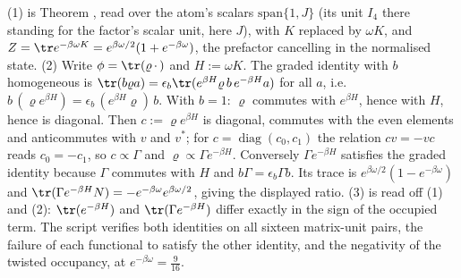 (1) is Theorem , read over the atom's scalars $\mathrm{span}\{1, J\}$ (its unit $I_4$ there standing for the factor's scalar unit, here $J$), with $K$ replaced by $\omega K$, and $Z = \tr e^{-\beta\omega K} = e^{\beta\omega/2}(1 + e^{-\beta\omega})$, the prefactor cancelling in the normalised state. (2) Write $\phi = \tr(\varrho\,\cdot\,)$ and $H := \omega K$. The graded identity with $b$ homogeneous is $\tr(b\varrho a) = \epsilon_b\tr(e^{\beta H}\varrho\,b\,e^{-\beta H}a)$ for all $a$, i.e.\ $b\,(\varrho e^{\beta H}) = \epsilon_b\,(e^{\beta H}\varrho)\,b$. With $b = 1$: $\varrho$ commutes with $e^{\beta H}$, hence with $H$, hence is diagonal. Then $c := \varrho e^{\beta H}$ is diagonal, commutes with the even elements and anticommutes with $v$ and $v^{*}$; for $c = \operatorname{diag}(c_0, c_1)$ the relation $cv = -vc$ reads $c_0 = -c_1$, so $c \propto \Gamma$ and $\varrho \propto \Gamma e^{-\beta H}$. Conversely $\Gamma e^{-\beta H}$ satisfies the graded identity because $\Gamma$ commutes with $H$ and $b\Gamma = \epsilon_b\Gamma b$. Its trace is $e^{\beta\omega/2}(1 - e^{-\beta\omega})$ and $\tr(\Gamma e^{-\beta H}N) = -e^{-\beta\omega}e^{\beta\omega/2}$, giving the displayed ratio. (3) is read off (1) and (2): $\tr(e^{-\beta H}) $ and $\tr(\Gamma e^{-\beta H})$ differ exactly in the sign of the occupied term. The script verifies both identities on all sixteen matrix-unit pairs, the failure of each functional to satisfy the other identity, and the negativity of the twisted occupancy, at $e^{-\beta\omega} = \tfrac{9}{16}$.
